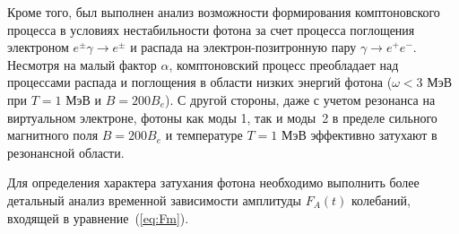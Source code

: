 \documentclass[14pt, russian]{article}
\begin{document}
Кроме того, был выполнен анализ возможности формирования комптоновского процесса в условиях нестабильности фотона за счет процесса поглощения электроном $e^\pm\gamma\to e^\pm$ и распада на электрон-позитронную пару $\gamma\to e^+e^-$. Несмотря на малый фактор $\alpha$, комптоновский процесс преобладает над процессами распада и поглощения в области низких энергий фотона ($\omega<3$ МэВ при $T=1$ МэВ и $B =200B_e$). С другой стороны, даже с учетом резонанса на виртуальном электроне, фотоны как моды 1, так и моды~2 в пределе сильного магнитного поля $B=200 B_e$ и температуре $T=1$ МэВ эффективно затухают в резонансной области.

Для определения характера затухания фотона необходимо выполнить более детальный анализ временной зависимости амплитуды $F_A(t)$ колебаний, входящей в уравнение~(\ref{eq:Fm}).

\end{document}
